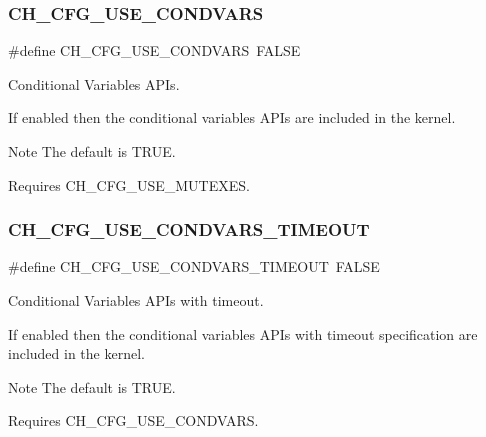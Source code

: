 \subsubsection{\texorpdfstring{C\+H\+\_\+\+C\+F\+G\+\_\+\+U\+S\+E\+\_\+\+C\+O\+N\+D\+V\+A\+RS}{CH\_CFG\_USE\_CONDVARS}}
{\footnotesize\ttfamily \#define C\+H\+\_\+\+C\+F\+G\+\_\+\+U\+S\+E\+\_\+\+C\+O\+N\+D\+V\+A\+RS~F\+A\+L\+SE}



Conditional Variables A\+P\+Is. 

If enabled then the conditional variables A\+P\+Is are included in the kernel.

\begin{DoxyNote}{Note}
The default is {\ttfamily T\+R\+UE}. 

Requires {\ttfamily C\+H\+\_\+\+C\+F\+G\+\_\+\+U\+S\+E\+\_\+\+M\+U\+T\+E\+X\+ES}. 
\end{DoxyNote}
\hypertarget{group__config_gae286dae62e72f6bd17ecfbd69194b1bb}{}\label{group__config_gae286dae62e72f6bd17ecfbd69194b1bb} 
\subsubsection{\texorpdfstring{C\+H\+\_\+\+C\+F\+G\+\_\+\+U\+S\+E\+\_\+\+C\+O\+N\+D\+V\+A\+R\+S\+\_\+\+T\+I\+M\+E\+O\+UT}{CH\_CFG\_USE\_CONDVARS\_TIMEOUT}}
{\footnotesize\ttfamily \#define C\+H\+\_\+\+C\+F\+G\+\_\+\+U\+S\+E\+\_\+\+C\+O\+N\+D\+V\+A\+R\+S\+\_\+\+T\+I\+M\+E\+O\+UT~F\+A\+L\+SE}



Conditional Variables A\+P\+Is with timeout. 

If enabled then the conditional variables A\+P\+Is with timeout specification are included in the kernel.

\begin{DoxyNote}{Note}
The default is {\ttfamily T\+R\+UE}. 

Requires {\ttfamily C\+H\+\_\+\+C\+F\+G\+\_\+\+U\+S\+E\+\_\+\+C\+O\+N\+D\+V\+A\+RS}. 
\end{DoxyNote}
\hypertarget{group__config_ga6ae82f40768d872dea807aac79e38deb}{}\label{group__config_ga6ae82f40768d872dea807aac79e38deb} 
